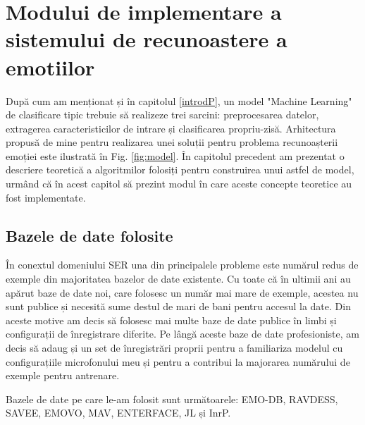 \documentclass[a4paper,12pt]{book}
\begin{document}
				\section{Modului de implementare a sistemului de recunoastere a emotiilor}
				
				După cum am menționat și în capitolul \ref{introdP}, un model "Machine Learning" de clasificare tipic trebuie să realizeze trei sarcini: preprocesarea datelor, extragerea caracteristicilor de intrare și clasificarea propriu-zisă. Arhitectura propusă de mine pentru realizarea unei soluții pentru problema recunoașterii emoției este ilustrată în Fig. \ref{fig:model}. În capitolul precedent am prezentat o descriere teoretică a algoritmilor folosiți pentru construirea unui astfel de model, urmând că în acest capitol să prezint modul în care aceste concepte teoretice au fost implementate.
				
					\subsection {Bazele de date folosite} \label{datasets}
					În conextul domeniului SER una din principalele probleme este numărul redus de exemple din majoritatea bazelor de date existente. Cu toate că în ultimii ani au apărut baze de date noi, care folosesc un număr mai mare de exemple, acestea nu sunt publice și necesită sume destul de mari de bani pentru accesul la date. Din aceste motive am decis să folosesc mai multe baze de date publice în limbi și configurații de înregistrare diferite. Pe lângă aceste baze de date profesioniste, am decis să adaug și un set de înregistrări proprii pentru a familiariza modelul cu configurațiile microfonului meu și pentru a contribui la majorarea numărului de exemple pentru antrenare.\par
					
					\newpage
					Bazele de date pe care le-am folosit sunt următoarele: EMO-DB, RAVDESS, SAVEE, EMOVO, MAV, ENTERFACE, JL și InrP.
					
\end{document}
